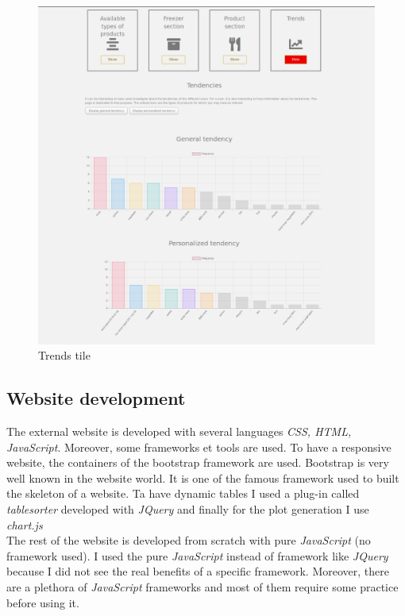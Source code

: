 \begin{figure}[H]
\centering
\includegraphics[scale=0.3]{./images/dashboard_trends.png}
\caption{Trends tile}
\label{fig:dashboard_trends}
\end{figure}

\subsection{Website development}
The external website is developed with several languages \textit{CSS, HTML, JavaScript}. Moreover, some frameworks et tools are used. To have a responsive website, the containers of the bootstrap framework are used. Bootstrap is very well known in the website world. It is one of the famous framework used to built the skeleton of a website. Ta have dynamic tables I used a plug-in called \textit{tablesorter} developed with \textit{JQuery} and finally for the plot generation I use \textit{chart.js} \\

The rest of the website is developed from scratch with pure \textit{JavaScript} (no framework used). I used the pure \textit{JavaScript} instead of framework like \textit{JQuery} because I did not see the real benefits of a specific framework. Moreover, there are a plethora of \textit{JavaScript} frameworks and most of them require some practice before using it.\\

